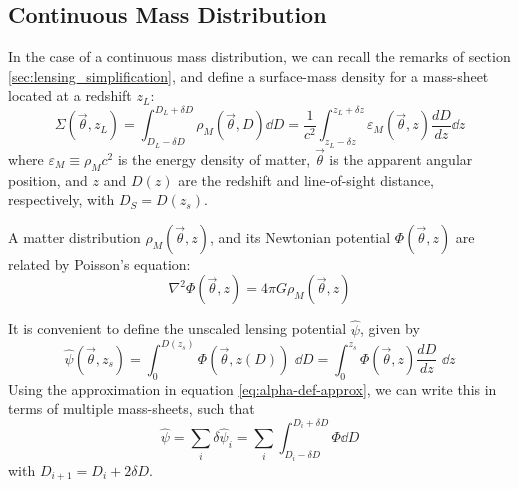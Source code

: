 \subsection{Continuous Mass Distribution}
In the case of a continuous mass distribution, we can recall the remarks of section \ref{sec:lensing_simplification}, and define a surface-mass density for a mass-sheet located at a redshift $z_L$:
\begin{equation}
  \label{eq:sigma-def}
  \Sigma(\vec{\theta},z_L) 
  = \int_{D_L-\delta D}^{D_L+\delta D}\rho_M(\vec{\theta},D)\dd D 
  = \frac{1}{c^2}\int_{z_L - \delta z}^{z_L + \delta z} 
  \varepsilon_M(\vec{\theta},z)\frac{dD}{dz}\dd z
\end{equation}
where $\varepsilon_M \equiv \rho_M c^2$ is the energy density of matter,
$\vec{\theta}$ is the apparent angular position, and $z$ and $D(z)$ are the 
redshift and line-of-sight distance, respectively, with $D_S = D(z_s)$.  

A matter distribution $\rho_M(\vec{\theta},z)$, and its Newtonian potential $\Phi(\vec{\theta},z)$ are related by Poisson's equation:
\begin{equation}
  \label{eq:poisson}
  \nabla^2 \Phi(\vec{\theta},z) = 4\pi G \rho_M(\vec{\theta},z)
\end{equation}

It is convenient to define the unscaled lensing potential $\hat{\psi}$, 
given by
\begin{equation}
  \hat{\psi}(\vec{\theta},z_s) 
  = \int_{0}^{D(z_s)} \Phi(\vec{\theta},z(D))\,\,\dd D 
  = \int_{0}^{z_s}\Phi(\vec{\theta},z)\frac{dD}{dz}\,\,\dd z
\end{equation}
Using the approximation in equation \ref{eq:alpha-def-approx}, we can write this in terms of multiple mass-sheets, such that
\begin{equation}
  \hat{\psi} = \sum_i \delta \hat{\psi}_i 
  = \sum_i \int_{D_i-\delta D}^{D_i+\delta D}\Phi \dd D
\end{equation}
with $D_{i+1} = D_i + 2\delta D$.


